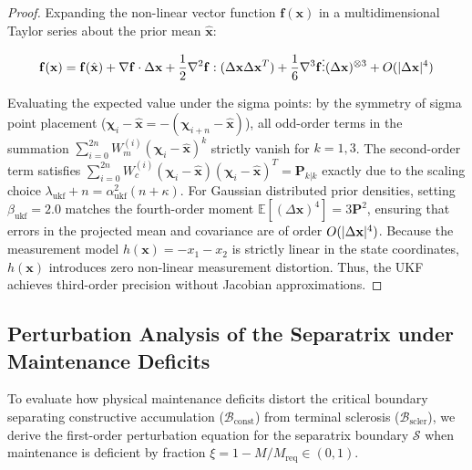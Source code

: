 \documentclass[preprint,12pt,authoryear]{elsarticle}
\theoremstyle{definition}
\begin{document}
\begin{proof}
Expanding the non-linear vector function $\mathbf{f}(\mathbf{x})$ in a multidimensional Taylor series about the prior mean $\hat{\mathbf{x}}$:

$$\mathbf{f}(\mathbf{x}) = \mathbf{f}(\hat{\mathbf{x}}) + \nabla \mathbf{f} \cdot \Delta \mathbf{x} + \frac{1}{2} \nabla^2 \mathbf{f} : (\Delta \mathbf{x} \Delta \mathbf{x}^T) + \frac{1}{6} \nabla^3 \mathbf{f} \\ \vdots \\ (\Delta \mathbf{x})^{\otimes 3} + O(\\|\Delta \mathbf{x}\\|^4)$$

Evaluating the expected value under the sigma points: by the symmetry of sigma point placement ($\boldsymbol{\chi}_i - \hat{\mathbf{x}} = -(\boldsymbol{\chi}_{i+n} - \hat{\mathbf{x}})$), all odd-order terms in the summation $\sum_{i=0}^{2n} W_m^{(i)} (\boldsymbol{\chi}_i - \hat{\mathbf{x}})^k$ strictly vanish for $k = 1, 3$. The second-order term satisfies $\sum_{i=0}^{2n} W_c^{(i)} (\boldsymbol{\chi}_i - \hat{\mathbf{x}})(\boldsymbol{\chi}_i - \hat{\mathbf{x}})^T = \mathbf{P}_{k|k}$ exactly due to the scaling choice $\lambda_{\text{ukf}} + n = \alpha_{\text{ukf}}^2(n + \kappa)$. For Gaussian distributed prior densities, setting $\beta_{\text{ukf}} = 2.0$ matches the fourth-order moment $\mathbb{E}[(\Delta \mathbf{x})^4] = 3 \mathbf{P}^2$, ensuring that errors in the projected mean and covariance are of order $O(\\|\Delta \mathbf{x}\\|^4)$. Because the measurement model $h(\mathbf{x}) = -x_1 - x_2$ is strictly linear in the state coordinates, $h(\mathbf{x})$ introduces zero non-linear measurement distortion. Thus, the UKF achieves third-order precision without Jacobian approximations. \end{proof}

\subsection{Perturbation Analysis of the Separatrix under Maintenance Deficits}

To evaluate how physical maintenance deficits distort the critical boundary separating constructive accumulation ($\mathcal{B}_{\text{const}}$) from terminal sclerosis ($\mathcal{B}_{\text{scler}}$), we derive the first-order perturbation equation for the separatrix boundary $\mathcal{S}$ when maintenance is deficient by fraction $\xi = 1 - M/M_{\text{req}} \in (0, 1)$.
\end{document}
